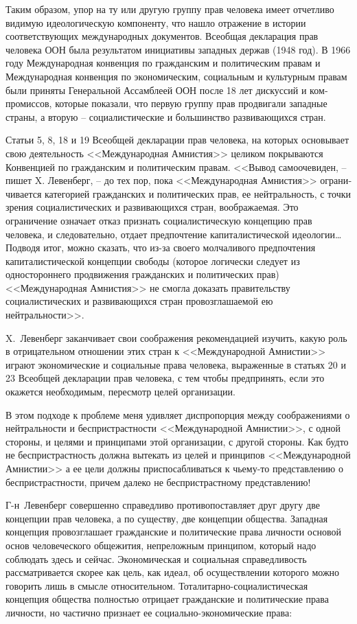 \documentclass{book}
\begin{document}
Таким образом, упор на ту или другую группу прав чело­века имеет отчетливо видимую идеологическую компоненту, что нашло отражение в истории соответствующих международ­ных документов. Всеобщая декларация прав человека ООН была результатом инициативы западных держав (1948 год). В 1966 году Международная конвенция по гражданским и по­литическим правам и Международная конвенция по экономи­ческим, социальным и культурным правам были приняты Ге­неральной Ассамблеей ООН после 18 лет дискуссий и ком­промиссов, которые показали, что первую группу прав про­двигали западные страны, а вторую -- социалистические и боль­шинство развивающихся стран.

Статьи 5, 8, 18 и 19 Всеобщей декларации прав человека, на которых основывает свою деятельность <<Международная Ам­нистия>> целиком покрываются Конвенцией по гражданским и политическим правам. <<Вывод самоочевиден, -- пишет X. Левенберг, -- до тех пор, пока <<Международная Амнистия>> ограни­чивается категорией гражданских и политических прав, ее нейтральность, с точки зрения социалистических и развива­ющихся стран, воображаемая. Это ограничение означает от­каз признать социалистическую концепцию прав человека, и следовательно, отдает предпочтение капиталистической идео­логии\ldots Подводя итог, можно сказать, что из-за своего молча­ливого предпочтения капиталистической концепции свободы (которое логически следует из одностороннего продвижения гражданских и политических прав) <<Международная Амнистия>> не смогла доказать правительству социалистических и развива­ющихся стран провозглашаемой ею нейтральности>>.

X.~Левенберг заканчивает свои соображения рекоменда­цией изучить, какую роль в отрицательном отношении этих стран к <<Международной Амнистии>> играют экономические и со­циальные права человека, выраженные в статьях 20 и 23 Всеоб­щей декларации прав человека, с тем чтобы предпринять, ес­ли это окажется необходимым, пересмотр целей организации.

В этом подходе к проблеме меня удивляет диспропорция между соображениями о нейтральности и беспристрастности <<Международной Амнистии>>, с одной стороны, и целями и прин­ципами этой организации, с другой стороны. Как будто не беспристрастность должна вытекать из целей и принципов <<Международной Амнистии>> а ее цели должны приспосабливаться к чьему-то представлению о беспристрастности, причем далеко не беспристрастному представлению!

Г-н~Левенберг совершенно справедливо противопоставляет друг другу две концепции прав человека, а по существу, две концепции общества. Западная концепция провозглашает граж­данские и политические права личности основой основ чело­веческого общежития, непреложным принципом, который на­до соблюдать здесь и сейчас. Экономическая и социальная спра­ведливость рассматривается скорее как цель, как идеал, об осуществлении которого можно говорить лишь в смысле отно­сительном. Тоталитарно-социалистическая концепция общества полностью отрицает гражданские и политические права лично­сти, но частично признает ее социально-экономические права:
\end{document}
